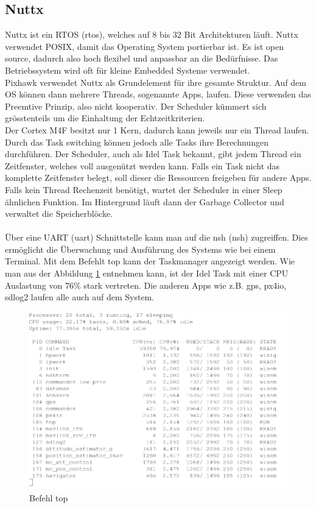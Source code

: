 \subsection{Nuttx}
Nuttx ist ein RTOS (\acrlong{rtos}), welches auf 8 bis 32 Bit Architekturen läuft. Nuttx verwendet POSIX, damit das Operating System portierbar ist. Es ist open source, dadurch also hoch flexibel und anpassbar an die Bedürfnisse. Das Betriebssystem wird oft für kleine Embedded Systeme verwendet.
\\
Pixhawk verwendet Nuttx als Grundelement für ihre gesamte Struktur. Auf dem OS können dann mehrere Threads, sogenannte Apps, laufen. Diese verwenden das Preemtive Prinzip, also nicht kooperativ. Der Scheduler kümmert sich grösstenteils um die Einhaltung der Echtzeitkriterien.
\\
Der Cortex M4F besitzt nur 1 Kern, dadurch kann jeweils nur ein Thread laufen. Durch das Task switching können jedoch alle Tasks ihre Berechnungen durchführen. Der Scheduler, auch als Idel Task bekannt, gibt jedem Thread ein Zeitfenster, welches voll ausgenützt werden kann. Falls ein Task nicht das komplette Zeitfenster belegt, soll dieser die Ressourcen freigeben für andere Apps. Falls kein Thread Rechenzeit benötigt, wartet der Scheduler in einer Sleep ähnlichen Funktion. Im Hintergrund läuft dann der Garbage Collector und verwaltet die Speicherblöcke.\\
\\
Über eine UART (\acrlong{uart}) Schnittstelle kann man auf die nsh (\acrlong{nsh}) zugreiffen. Dies ermöglicht die Überwachung und Ausführung des Systems wie bei einem Terminal. Mit dem Befehlt top kann der Taskmanager angezeigt werden. Wie man aus der Abbildung \ref{fig:top} entnehmen kann, ist der Idel Task mit einer CPU Auslastung von 76\% stark vertreten. Die anderen Apps wie z.B. gps, px4io, sdlog2 laufen alle auch auf dem System.

\begin{figure}[ht]
  \begin{center}
  \includegraphics[scale=0.5]{pic/20_pixhawk/top2.png}
  \caption{Befehl top}
  \label{fig:top}
  \end{center}
\end{figure}

\clearpage